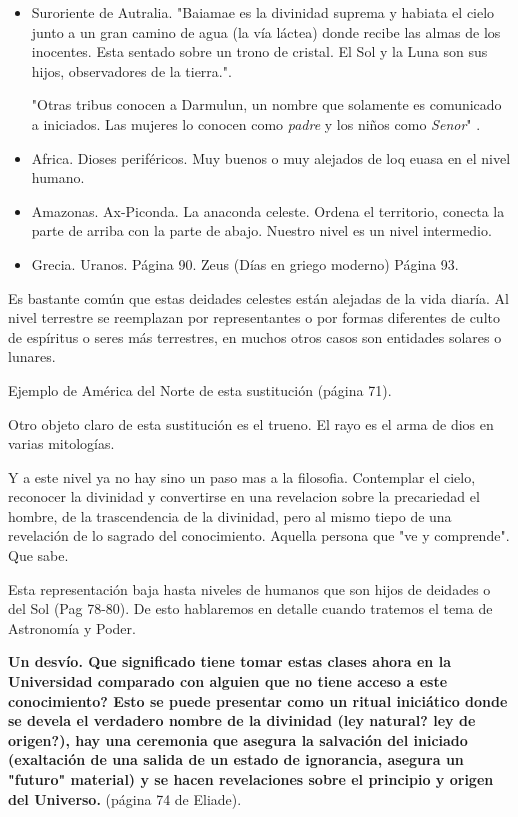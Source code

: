 \documentclass{report}
\begin{document}
\begin{itemize}
\item Suroriente de Autralia. "Baiamae es la divinidad suprema y
  habiata el cielo junto a un gran camino de agua (la v\'ia
  l\'actea) donde recibe las almas de los inocentes. Esta sentado
  sobre un trono de cristal. El Sol y la Luna son sus hijos,
  observadores de la tierra."\cite{Eliade}.

"Otras tribus conocen a Darmulun, un nombre que solamente es
  comunicado a iniciados. Las mujeres lo conocen como \emph{padre} y los
  ni\~nos como \emph{Senor}" \cite{Eliade}.

\item Africa. Dioses perif\'ericos. Muy buenos o muy alejados de loq
  euasa en el nivel humano.

\item Amazonas. Ax-Piconda. La anaconda celeste. Ordena el territorio,
  conecta la parte de arriba con la parte de abajo. Nuestro nivel es
  un nivel intermedio. 

\item Grecia. Uranos. P\'agina 90. Zeus (D\'ias en griego moderno)
  P\'agina 93.
\end{itemize}

Es bastante com\'un que estas deidades celestes est\'an alejadas de la
vida diar\'ia. Al nivel terrestre se reemplazan por representantes o
por formas diferentes de  culto de esp\'iritus o seres m\'as
terrestres, en muchos otros casos son entidades solares o lunares. 

Ejemplo de Am\'erica del Norte de esta sustituci\'on (p\'agina 71).

Otro objeto claro de esta sustituci\'on es el trueno.  El rayo es el
arma de dios en varias mitolog\'ias. 

Y a este nivel ya no hay sino un paso mas a la filosofia. Contemplar
el cielo, reconocer la divinidad y convertirse en una revelacion sobre
la precariedad el hombre, de la trascendencia de la divinidad, pero al
mismo tiepo de una revelaci\'on de lo sagrado del
conocimiento. Aquella persona que "ve y comprende". Que sabe.

Esta representaci\'on baja hasta niveles de humanos que son hijos de
deidades o del Sol \cite{Eliade} (Pag 78-80). De esto hablaremos en
detalle cuando tratemos el tema de Astronom\'ia y Poder.


{\bf Un desv\'io. Que significado tiene tomar estas clases ahora en la
Universidad comparado con alguien que no tiene acceso a este
conocimiento?
Esto se puede presentar como un ritual inici\'atico donde se devela el
verdadero nombre de la divinidad (ley natural? ley de origen?), hay
una ceremonia que asegura la salvaci\'on del iniciado (exaltaci\'on de
una salida de un estado de ignorancia, asegura un "futuro" material) y se hacen
revelaciones sobre el principio y origen del Universo. }(p\'agina 74
de Eliade). 
\end{document}
